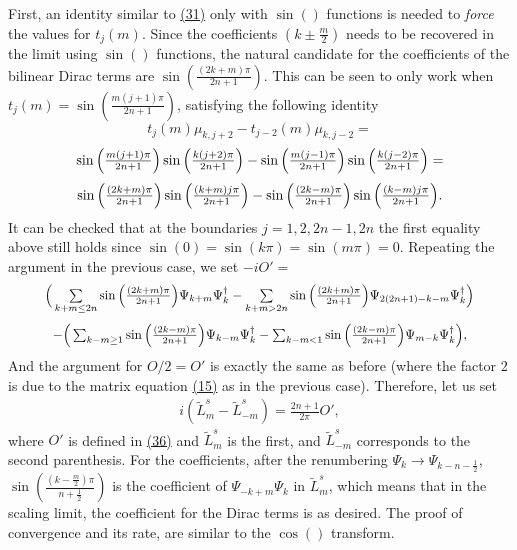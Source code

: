 \documentclass[twoside,11pt,titlepage]{amsart}
\renewcommand{\=}[1]{\stackrel{#1}{=}} %
\theoremstyle{definition}
\theoremstyle{remark}
\begin{document}
First, an identity similar to \hyperref[eq31]{(31)} only with $\sin()$ functions is needed to \textit{force} the values for $t_j(m)$. Since the coefficients $(k\pm \frac{m}{2})$ needs to be recovered in the limit using $\sin()$ functions, the natural candidate for the coefficients of the bilinear Dirac terms are $\sin(\frac{(2k+m)\pi}{2n+1})$. This can be seen to only work when $t_j(m)=\sin(\frac{m(j+1)\pi}{2n+1})$, satisfying the following identity
$$t_j(m)\mu_{k,j+2}-t_{j-2}(m)\mu_{k,j-2}=$$
\begin{gather}\label{eq35}
\scalebox{0.999}{$
\sin\Big(\frac{m(j+1)\pi}{2n+1}\Big)\sin \Big(\frac{k(j+2)\pi}{2n+1}\Big)-\sin\Big(\frac{m(j-1)\pi}{2n+1}\Big)\sin\Big(\frac{k(j-2)\pi}{2n+1} \Big)=$}
\end{gather}
\begin{gather*}
\scalebox{0.999}{$\sin \Big(\frac{(2k+m)\pi}{2n+1}\Big)\sin \Big(\frac{(k+m)j\pi}{2n+1} \Big)-\sin \Big(\frac{(2k-m)\pi}{2n+1}\Big)\sin \Big(\frac{(k-m)j\pi}{2n+1} \Big).$}
\end{gather*}
It can be checked that at the boundaries $j=1,2,2n-1,2n$ the first equality above still holds since $\sin(0)=\sin(k\pi)=\sin(m\pi)=0$. Repeating the argument in the previous case, we set $-iO'=$
\begin{gather}\label{eq36}
\scalebox{0.93}{$
\Big(\sum\limits_{k+m \le 2n} \sin\Big(\frac{(2k+m)\pi}{2n+1}\Big) \Psi_{k+m}\Psi_{k}^\dagger-\sum\limits_{k+m>2n} \sin\Big(\frac{(2k+m)\pi}{2n+1}\Big)\Psi_{2(2n+1)-k-m}\Psi_{k}^\dagger \Big)$}
\end{gather}
\begin{gather*}
\scalebox{0.93}{$-\Big(\sum_{k-m \ge 1} \sin\Big(\frac{(2k-m)\pi}{2n+1}\Big)\Psi_{k-m}\Psi_{k}^\dagger-\sum_{k-m<1} \sin\Big(\frac{(2k-m)\pi}{2n+1}\Big)\Psi_{m-k}\Psi_{k}^\dagger \Big),$}
\end{gather*}
And the argument for $O/2=O'$ is exactly the same as before (where the factor $2$ is due to the matrix equation \hyperref[eq15]{(15)} as in the previous case). Therefore, let us set
\begin{align}\label{eq37}
i(\widetilde{L}_{m}^s-\widetilde{L}_{-m}^s)=\frac{2n+1}{2\pi}O',
\end{align}
where $O'$ is defined in \hyperref[eq36]{(36)} and $\widetilde{L}_m^s$ is the first, and $\widetilde{L}_{-m}^s$ corresponds to the second parenthesis. For the coefficients, after the renumbering $\Psi_{k} \to \Psi_{k-n-\frac{1}{2}}$, $\sin(\frac{(k-\frac{m}{2})\pi}{n+\frac{1}{2}})$ is the coefficient of $\Psi_{-k+m}\Psi_k$ in $\widetilde{L}_m^s$,
which means that in the scaling limit, the coefficient for the Dirac terms is as desired. The proof of convergence and its rate, are similar to the $\cos()$ transform. 
\end{document}
